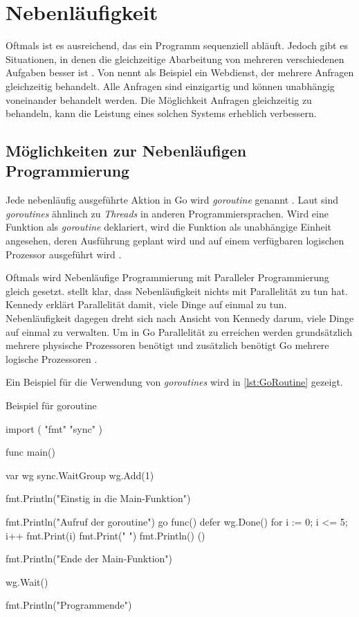 \chapter{Nebenläufigkeit}
Oftmals ist es ausreichend, das ein Programm sequenziell abläuft.
Jedoch gibt es Situationen, in denen die gleichzeitige Abarbeitung von mehreren verschiedenen Aufgaben besser ist \cite[S.128]{Kennedy.2016}.
Von \cite[S.128]{Kennedy.2016} nennt als Beispiel ein Webdienst, der mehrere Anfragen gleichzeitig behandelt.
Alle Anfragen sind einzigartig und können unabhängig voneinander behandelt werden.
Die Möglichkeit Anfragen gleichzeitig zu behandeln, kann die Leistung eines solchen Systems erheblich verbessern. 

\section{Möglichkeiten zur Nebenläufigen Programmierung}
Jede nebenläufig ausgeführte Aktion in Go wird \textit{goroutine} genannt \cite[S.352]{Donovan.2016}.
Laut \cite[S.352]{Donovan.2016} sind \textit{goroutines} ähnlinch zu \textit{Threads}  in anderen Programmiersprachen.
Wird eine Funktion als \textit{goroutine} deklariert, wird die Funktion als unabhängige Einheit angesehen, deren Ausführung geplant wird und auf einem verfügbaren logischen Prozessor ausgeführt wird \cite[S.128]{Kennedy.2016}.

Oftmals wird Nebenläufige Programmierung mit Paralleler Programmierung gleich gesetzt. 
\cite[S.131]{Kennedy.2016} stellt klar, dass Nebenläufigkeit nichts mit Parallelität zu tun hat.
Kennedy erklärt Parallelität damit, viele Dinge auf einmal zu tun.
Nebenläufigkeit dagegen dreht sich nach Ansicht von Kennedy darum, viele Dinge auf einmal zu verwalten.
Um in Go Parallelität zu erreichen werden grundsätzlich mehrere physische Prozessoren benötigt und zusätzlich benötigt Go mehrere logische Prozessoren \cite[S.131]{Kennedy.2016}.

Ein Beispiel für die Verwendung von \textit{goroutines} wird in \autoref{lst:GoRoutine} gezeigt.

\begin{listing}[H]
\caption{Beispiel für goroutine}
\label{lst:GoRoutine}
\begin{GoCode}
import (
    "fmt"
    "sync"
)

func main() {
    var wg sync.WaitGroup
    wg.Add(1)
    
    fmt.Println("Einstig in die Main-Funktion")
    
    fmt.Println("Aufruf der goroutine")
    go func() {
        defer wg.Done()
        for i := 0; i <= 5; i++ {
            fmt.Print(i)
            fmt.Print(" ")
        }
        fmt.Println()
    }()
    
    fmt.Println("Ende der Main-Funktion")
    
    wg.Wait()
    
    fmt.Println("Programmende")
}
\end{GoCode}
\end{listing}

